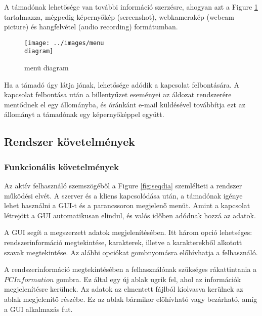 \documentclass[a4paper, 11pt]{article}
\begin{document}
A támadónak lehetősége van további információ szerzésre, ahogyan azt a Figure \ref{fig:menudia} tartalmazza, mégpedig képernyőkép (screenshot), webkamerakép (webcam picture) és hangfelvétel (audio recording) formátumban.
\begin{figure}[H]
\centering
\texttt{[image: ../images/menu\\ diagram]}
\caption{menü diagram}
\label{fig:menudia}
\end{figure}
Ha a támadó úgy látja jónak, lehetősége adódik a kapcsolat felbontására. A kapcsolat felbontása után a billentyűzet eseményei az áldozat rendszerére mentődnek el egy állományba, és óránkánt e-mail küldésével továbbítja ezt az állományt a támadónak egy képernyőképpel együtt.


\subsection{Rendszer követelmények}

\subsubsection{Funkcionális követelmények} %
Az aktív felhasználó szemszögéből a Figure \ref{fig:seqdia} szemlélteti a rendszer működési elvét. A szerver és a kliens kapcsolódása után, a támadónak igénye lehet használni a GUI-t és a parancssoron megjelenő menüt. Amint a kapcsolat létrejött a GUI automatikusan elindul, és valós időben adódnak hozzá az adatok.

A GUI segít a megszerzett adatok megjelenítésében. Itt három opció lehetséges: rendszerinformáció megtekintése, karakterek, illetve a karakterekből alkotott szavak megtekintése. Az alábbi opciókat gombnyomásra előhívhatja a felhasználó.

A rendszerinformáció megtekintésében a felhasználónak szükséges rákattintania a $PC Information$ gombra. Ez által egy új ablak ugrik fel, ahol az információk megjelenítésre kerülnek. Az adatok az elmentett fájlból kiolvasva kerülnek az ablak megjelenítő részébe. Ez az ablak bármikor előhívható vagy bezárható, amíg a GUI alkalmazás fut.
\end{document}
